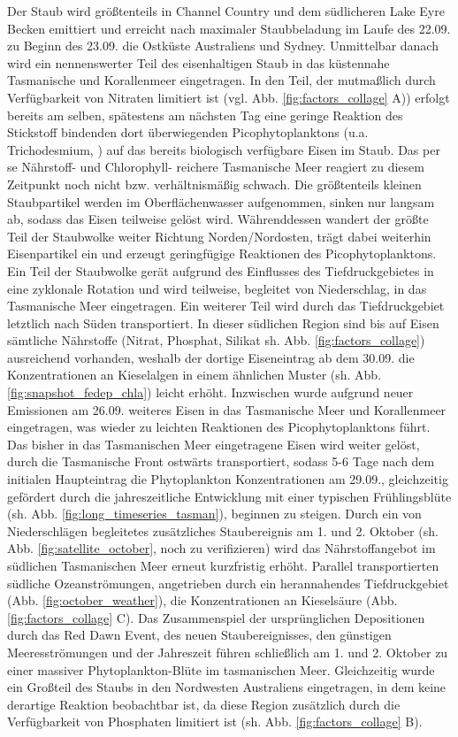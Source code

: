 \documentclass[12pt,a4paper,onecolumn,headheight=30pt]{scrartcl}
\begin{document}
Der Staub wird größtenteils in Channel Country und dem südlicheren Lake Eyre Becken emittiert und erreicht nach maximaler Staubbeladung im Laufe des 22.09. zu Beginn des 23.09. die Ostküste Australiens und Sydney. Unmittelbar danach wird ein nennenswerter Teil des eisenhaltigen Staub in das küstennahe Tasmanische und Korallenmeer eingetragen. In den Teil, der mutmaßlich durch Verfügbarkeit von  Nitraten limitiert ist (vgl. Abb. \ref{fig:factors_collage} A)) erfolgt bereits am selben, spätestens am nächsten Tag eine geringe Reaktion des Stickstoff bindenden dort überwiegenden Picophytoplanktons (u.a. Trichodesmium, \cite{Rubin.2011}) auf das bereits biologisch verfügbare Eisen im Staub. Das per se Nährstoff- und Chlorophyll- reichere Tasmanische Meer reagiert zu diesem Zeitpunkt noch nicht bzw. verhältnismäßig schwach. Die größtenteils kleinen Staubpartikel werden im Oberflächenwasser aufgenommen, sinken nur langsam ab, sodass das Eisen teilweise gelöst wird. Währenddessen wandert der größte Teil der Staubwolke weiter Richtung Norden/Nordosten, trägt dabei weiterhin Eisenpartikel ein und erzeugt geringfügige Reaktionen des Picophytoplanktons. Ein Teil der Staubwolke gerät aufgrund des Einflusses des Tiefdruckgebietes in eine zyklonale Rotation und wird teilweise, begleitet von Niederschlag, in das Tasmanische Meer eingetragen. Ein weiterer Teil wird durch das Tiefdruckgebiet letztlich nach Süden transportiert. In dieser südlichen Region sind bis auf Eisen sämtliche Nährstoffe (Nitrat, Phosphat, Silikat sh. Abb. \ref{fig:factors_collage}) ausreichend vorhanden, weshalb der dortige Eiseneintrag ab dem 30.09. die Konzentrationen an Kieselalgen in einem ähnlichen Muster (sh. Abb. \ref{fig:snapshot_fedep_chla}) leicht erhöht. Inzwischen wurde aufgrund neuer Emissionen am 26.09. weiteres Eisen in das Tasmanische Meer und Korallenmeer eingetragen, was wieder zu leichten Reaktionen des Picophytoplanktons führt. Das bisher in das Tasmanischen Meer eingetragene Eisen wird weiter gelöst, durch die Tasmanische Front ostwärts transportiert, sodass 5-6 Tage nach dem initialen Haupteintrag die Phytoplankton Konzentrationen am 29.09., gleichzeitig gefördert durch die jahreszeitliche Entwicklung mit einer typischen Frühlingsblüte (sh. Abb. \ref{fig:long_timeseries_tasman}), beginnen zu steigen. Durch ein von Niederschlägen begleitetes zusätzliches Staubereignis am 1. und 2. Oktober (sh. Abb. \ref{fig:satellite_october}, noch zu verifizieren) wird das Nährstoffangebot im südlichen Tasmanischen Meer erneut kurzfristig erhöht. Parallel transportierten südliche Ozeanströmungen, angetrieben durch ein herannahendes Tiefdruckgebiet (Abb. \ref{fig:october_weather}), die Konzentrationen an Kieselsäure (Abb. \ref{fig:factors_collage} C). Das Zusammenspiel der ursprünglichen Depositionen durch das Red Dawn Event, des neuen Staubereignisses, den günstigen Meeresströmungen und der Jahreszeit führen schließlich am 1. und 2. Oktober zu einer massiver Phytoplankton-Blüte im tasmanischen Meer. Gleichzeitig wurde ein Großteil des Staubs in den Nordwesten Australiens eingetragen, in dem keine derartige Reaktion beobachtbar ist, da diese Region zusätzlich durch die Verfügbarkeit von Phosphaten limitiert ist (sh. Abb. \ref{fig:factors_collage} B). \\
\end{document}
